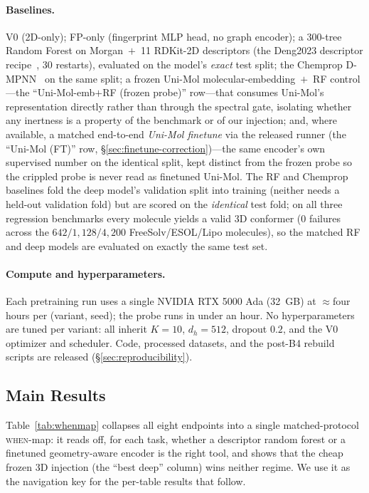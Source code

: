 \documentclass[sigconf,nonacm,anonymous,review]{acmart}
\begin{document}
\paragraph{Baselines.} V0 (2D-only); FP-only (fingerprint MLP head, no graph encoder); a 300-tree Random Forest on Morgan~$+$~11 RDKit-2D descriptors (the Deng2023 descriptor recipe~\citep{deng2023systematic}, 30 restarts), evaluated on the model's \emph{exact} test split; the Chemprop D-MPNN~\cite{yang2019chemprop} on the same split; a frozen Uni-Mol molecular-embedding~$+$~RF control---the ``Uni-Mol-emb$+$RF (frozen probe)'' row---that consumes Uni-Mol's representation directly rather than through the spectral gate, isolating whether any inertness is a property of the benchmark or of our injection; and, where available, a matched end-to-end \emph{Uni-Mol finetune} via the released runner (the ``Uni-Mol (FT)'' row, \S\ref{sec:finetune-correction})---the same encoder's own supervised number on the identical split, kept distinct from the frozen probe so the crippled probe is never read as finetuned Uni-Mol. The RF and Chemprop baselines fold the deep model's validation split into training (neither needs a held-out validation fold) but are scored on the \emph{identical} test fold; on all three regression benchmarks every molecule yields a valid 3D conformer ($0$ failures across the $642/1{,}128/4{,}200$ FreeSolv/ESOL/Lipo molecules), so the matched RF and deep models are evaluated on exactly the same test set.
\paragraph{Compute and hyperparameters.} Each pretraining run uses a single NVIDIA RTX 5000 Ada (32~GB) at $\approx$four hours per (variant, seed); the probe runs in under an hour. No hyperparameters are tuned per variant: all inherit $K{=}10$, $d_h{=}512$, dropout $0.2$, and the V0 optimizer and scheduler. Code, processed datasets, and the post-B4 rebuild scripts are released (\S\ref{sec:reproducibility}).

\subsection{Main Results}
Table~\ref{tab:whenmap} collapses all eight endpoints into a single matched-protocol \textsc{when}-map: it reads off, for each task, whether a descriptor random forest or a finetuned geometry-aware encoder is the right tool, and shows that the cheap frozen 3D injection (the ``best deep'' column) wins neither regime. We use it as the navigation key for the per-table results that follow.
\end{document}
